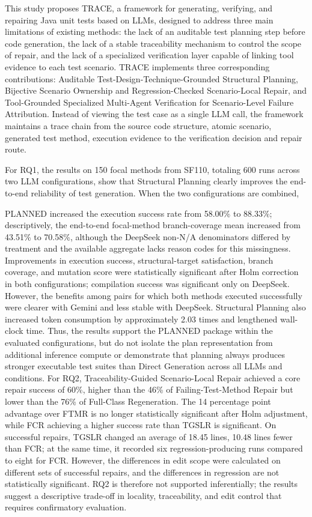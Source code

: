 \documentclass[pdflatex,sn-basic,Numbered,iicol]{sn-jnl}
\begin{document}
This study proposes TRACE, a framework for generating, verifying, and repairing Java unit tests based on LLMs, designed to address three main limitations of existing methods: the lack of an auditable test planning step before code generation, the lack of a stable traceability mechanism to control the scope of repair, and the lack of a specialized verification layer capable of linking tool evidence to each test scenario. TRACE implements three corresponding contributions: Auditable Test-Design-Technique-Grounded Structural Planning, Bijective Scenario Ownership and Regression-Checked Scenario-Local Repair, and Tool-Grounded Specialized Multi-Agent Verification for Scenario-Level Failure Attribution. Instead of viewing the test case as a single LLM call, the framework maintains a trace chain from the source code structure, atomic scenario, generated test method, execution evidence to the verification decision and repair route.

For RQ1, the results on 150 focal methods from SF110, totaling 600 runs across two LLM configurations, show that Structural Planning clearly improves the end-to-end reliability of test generation. When the two configurations are combined,

PLANNED increased the execution success rate from 58.00\% to 88.33\%; descriptively, the end-to-end focal-method branch-coverage mean increased from 43.51\% to 70.58\%, although the DeepSeek non-N/A denominators differed by treatment and the available aggregate lacks reason codes for this missingness. Improvements in execution success, structural-target satisfaction, branch coverage, and mutation score were statistically significant after Holm correction in both configurations; compilation success was significant only on DeepSeek. However, the benefits among pairs for which both methods executed successfully were clearer with Gemini and less stable with DeepSeek. Structural Planning also increased token consumption by approximately 2.03 times and lengthened wall-clock time. Thus, the results support the PLANNED package within the evaluated configurations, but do not isolate the plan representation from additional inference compute or demonstrate that planning always produces stronger executable test suites than Direct Generation across all LLMs and conditions. For RQ2, Traceability-Guided Scenario-Local Repair achieved a core repair success of 60\%, higher than the 46\% of Failing-Test-Method Repair but lower than the 76\% of Full-Class Regeneration. The 14 percentage point advantage over FTMR is no longer statistically significant after Holm adjustment, while FCR achieving a higher success rate than TGSLR is significant. On successful repairs, TGSLR changed an average of 18.45 lines, 10.48 lines fewer than FCR; at the same time, it recorded six regression-producing runs compared to eight for FCR. However, the differences in edit scope were calculated on different sets of successful repairs, and the differences in regression are not statistically significant. RQ2 is therefore not supported inferentially; the results suggest a descriptive trade-off in locality, traceability, and edit control that requires confirmatory evaluation.
\end{document}
